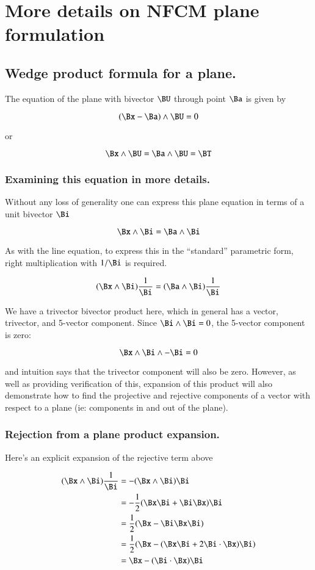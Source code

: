 \chapter{More details on NFCM plane formulation} %

\section{Wedge product formula for a plane.}

The equation of the plane with bivector $\BU$ through point $\Ba$ is given
by

\[
(\Bx - \Ba) \wedge \BU = 0
\]

or

\[
\Bx \wedge \BU = \Ba \wedge \BU = \BT
\]

\subsection{Examining this equation in more details. }

Without any loss of generality one can express this plane equation
in terms of a unit bivector $\Bi$

\[
\Bx \wedge \Bi = \Ba \wedge \Bi
\]

As with the line equation, to express this in the ``standard'' parametric
form, right multiplication with $1/\Bi$ is required.

\[
(\Bx \wedge \Bi)\frac{1}{\Bi} = (\Ba \wedge \Bi)\frac{1}{\Bi}
\]

We have a trivector bivector product here, which in general has a vector,
trivector, and 5-vector component.  Since $\Bi \wedge \Bi = 0$, the
5-vector component is zero:

\[
\Bx \wedge \Bi \wedge -\Bi = 0
\]

and intuition says that the trivector component will also be zero.  However,
as well as providing verification of this, expansion of this product will also
demonstrate how to find the projective and rejective components of a vector
with respect to a plane (ie: components in and out of the plane).

\subsection{Rejection from a plane product expansion.}

Here's an explicit expansion of the rejective term above

\begin{align*}
(\Bx \wedge \Bi)\frac{1}{\Bi} 
&= -(\Bx \wedge \Bi){\Bi} \\ 
&= -\frac{1}{2}(\Bx\Bi + \Bi\Bx){\Bi} \\ 
&= \frac{1}{2}(\Bx - \Bi\Bx\Bi) \\ 
&= \frac{1}{2}(\Bx - (\Bx \Bi + 2 \Bi \cdot \Bx)\Bi) \\ 
&= \Bx - (\Bi \cdot \Bx)\Bi \\ 
\end{align*}

